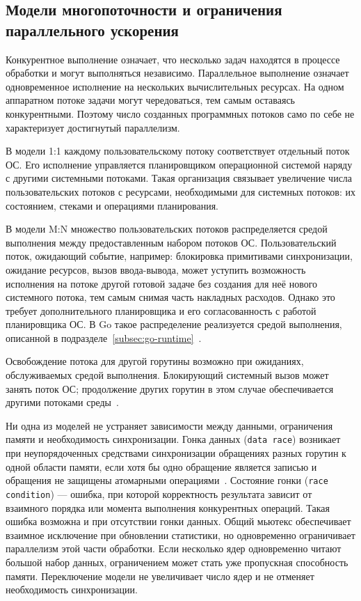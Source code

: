\subsection{Модели многопоточности и ограничения параллельного ускорения}
\label{subsec:threading-theory}

Конкурентное выполнение означает, что несколько задач находятся в процессе обработки и могут
  выполняться независимо. Параллельное выполнение означает одновременное исполнение на нескольких
  вычислительных ресурсах. На одном аппаратном потоке задачи могут чередоваться, тем самым оставаясь
  конкурентными. Поэтому число созданных программных потоков само по себе не характеризует
  достигнутый параллелизм.

В модели 1:1 каждому пользовательскому потоку соответствует отдельный поток ОС. Его исполнение
  управляется планировщиком операционной системой наряду с другими системными потоками. Такая организация
  связывает увеличение числа пользовательских потоков с ресурсами, необходимыми для системных
  потоков: их состоянием, стеками и операциями планирования.

В модели M:N множество пользовательских потоков распределяется средой выполнения между предоставленным набором
  потоков ОС. Пользовательский поток, ожидающий событие, например: блокировка примитивами синхронизации,
  ожидание ресурсов, вызов ввода-вывода, может уступить возможность исполнения на потоке
  другой готовой задаче без создания для неё нового системного потока, тем самым снимая часть накладных расходов. Однако это требует
  дополнительного планировщика и его согласованность с работой планировщика ОС. В Go такое распределение реализуется
  средой выполнения, описанной в подразделе~\ref{subsec:go-runtime}~\cite{go_runtime_hacking}.

Освобождение потока для другой горутины возможно при ожиданиях, обслуживаемых средой выполнения.
  Блокирующий системный вызов может занять поток ОС; продолжение других горутин в этом случае
  обеспечивается другими потоками среды~\cite{go_runtime_hacking}.

Ни одна из моделей не устраняет зависимости между данными, ограничения памяти и необходимость
  синхронизации. Гонка данных (\texttt{data race}) возникает при неупорядоченных средствами
  синхронизации обращениях разных горутин к одной области памяти, если хотя бы одно обращение
  является записью и обращения не защищены атомарными операциями~\cite{go_memory_model}.
  Состояние гонки (\texttt{race condition}) — ошибка, при которой корректность результата зависит
  от взаимного порядка или момента выполнения конкурентных операций. Такая ошибка возможна
  и при отсутствии гонки данных. Общий мьютекс обеспечивает взаимное исключение при обновлении
  статистики, но одновременно ограничивает параллелизм этой части обработки.
  Если несколько ядер одновременно читают большой набор данных, ограничением может стать уже
  пропускная способность памяти. Переключение модели не увеличивает число ядер и не отменяет необходимость синхронизации.

